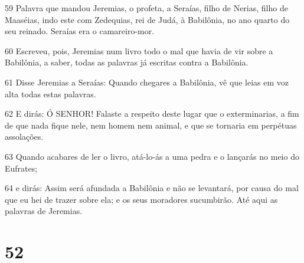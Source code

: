 \par 59 Palavra que mandou Jeremias, o profeta, a Seraías, filho de Nerias, filho de Maaséias, indo este com Zedequias, rei de Judá, à Babilônia, no ano quarto do seu reinado. Seraías era o camareiro-mor.
\par 60 Escreveu, pois, Jeremias num livro todo o mal que havia de vir sobre a Babilônia, a saber, todas as palavras já escritas contra a Babilônia.
\par 61 Disse Jeremias a Seraías: Quando chegares a Babilônia, vê que leias em voz alta todas estas palavras.
\par 62 E dirás: Ó SENHOR! Falaste a respeito deste lugar que o exterminarias, a fim de que nada fique nele, nem homem nem animal, e que se tornaria em perpétuas assolações.
\par 63 Quando acabares de ler o livro, atá-lo-ás a uma pedra e o lançarás no meio do Eufrates;
\par 64 e dirás: Assim será afundada a Babilônia e não se levantará, por causa do mal que eu hei de trazer sobre ela; e os seus moradores sucumbirão. Até aqui as palavras de Jeremias.

\chapter{52}


